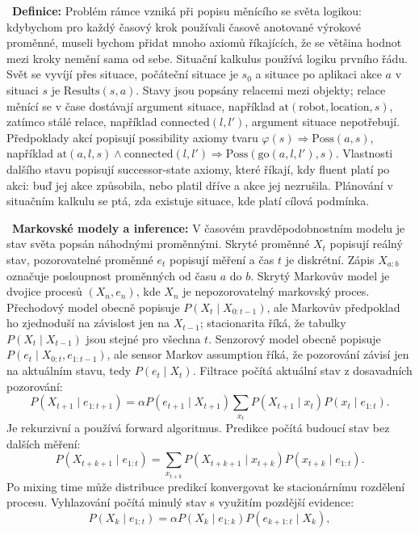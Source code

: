 \begin{odpoved}
\setlength{\parskip}{2pt}
\noindent{}\ \textbf{Definice:} Problém rámce vzniká při popisu měnícího se světa logikou: kdybychom pro každý časový krok používali časově anotované výrokové proměnné, museli bychom přidat mnoho axiomů říkajících, že se většina hodnot mezi kroky nemění sama od sebe. Situační kalkulus používá logiku prvního řádu. Svět se vyvíjí přes situace, počáteční situace je $s_0$ a situace po aplikaci akce $a$ v situaci $s$ je $\mathrm{Results}(s,a)$. Stavy jsou popsány relacemi mezi objekty; relace měnící se v čase dostávají argument situace, například $\mathrm{at}(\mathrm{robot},\mathrm{location},s)$, zatímco stálé relace, například $\mathrm{connected}(l,l')$, argument situace nepotřebují. Předpoklady akcí popisují possibility axiomy tvaru $\varphi(s)\Rightarrow \mathrm{Poss}(a,s)$, například $\mathrm{at}(a,l,s)\land\mathrm{connected}(l,l')\Rightarrow\mathrm{Poss}(\mathrm{go}(a,l,l'),s)$. Vlastnosti dalšího stavu popisují successor-state axiomy, které říkají, kdy fluent platí po akci: buď jej akce způsobila, nebo platil dříve a akce jej nezrušila. Plánování v situačním kalkulu se ptá, zda existuje situace, kde platí cílová podmínka.\par
\noindent{}\ \textbf{Markovské modely a inference:} V časovém pravděpodobnostním modelu je stav světa popsán náhodnými proměnnými. Skryté proměnné $X_t$ popisují reálný stav, pozorovatelné proměnné $e_t$ popisují měření a čas $t$ je diskrétní. Zápis $X_{a:b}$ označuje posloupnost proměnných od času $a$ do $b$. Skrytý Markovův model je dvojice procesů $(X_n,e_n)$, kde $X_n$ je nepozorovatelný markovský proces. Přechodový model obecně popisuje $P(X_t\mid X_{0:t-1})$, ale Markovův předpoklad ho zjednoduší na závislost jen na $X_{t-1}$; stacionarita říká, že tabulky $P(X_t\mid X_{t-1})$ jsou stejné pro všechna $t$. Senzorový model obecně popisuje $P(e_t\mid X_{0:t},e_{1:t-1})$, ale sensor Markov assumption říká, že pozorování závisí jen na aktuálním stavu, tedy $P(e_t\mid X_t)$. Filtrace počítá aktuální stav z dosavadních pozorování:
\[
P(X_{t+1}\mid e_{1:t+1})=\alpha P(e_{t+1}\mid X_{t+1})\sum_{x_t}P(X_{t+1}\mid x_t)P(x_t\mid e_{1:t}).
\]
Je rekurzivní a používá forward algoritmus. Predikce počítá budoucí stav bez dalších měření:
\[
P(X_{t+k+1}\mid e_{1:t})=\sum_{x_{t+k}}P(X_{t+k+1}\mid x_{t+k})P(x_{t+k}\mid e_{1:t}).
\]
Po mixing time může distribuce predikcí konvergovat ke stacionárnímu rozdělení procesu. Vyhlazování počítá minulý stav s využitím pozdější evidence:
\[
P(X_k\mid e_{1:t})=\alpha P(X_k\mid e_{1:k})P(e_{k+1:t}\mid X_k),
\]
\end{odpoved}
